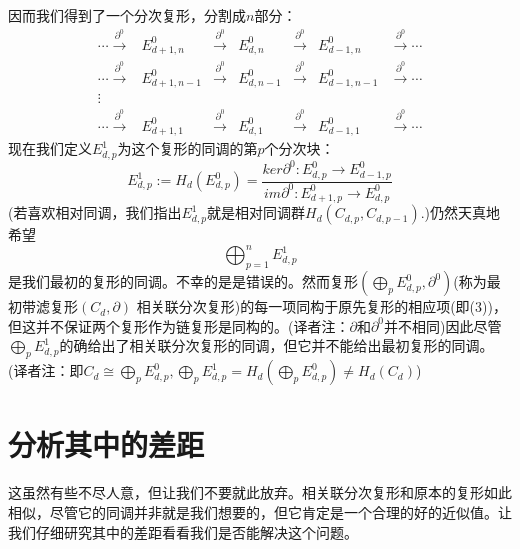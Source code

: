 \documentclass[a4paper,11pt,openany]{ctexart}
\begin{document}
因而我们得到了一个分次复形，分割成$n$部分：
\begin{equation}
  \begin{array}{ccccccc}
     \cdots\xrightarrow{\partial^0}& E_{d+1,n}^0& \xrightarrow{\partial^0}&E_{d,n}^0&\xrightarrow{\partial^0}&E_{d-1,n}^0& \xrightarrow{\partial^0} \cdots \\
     \cdots\xrightarrow{\partial^0}& E_{d+1,n-1}^0 & \xrightarrow{\partial^0}&E_{d,n-1}^0&\xrightarrow{\partial^0}&E_{d-1,n-1}^0& \xrightarrow{\partial^0} \cdots \\
     \vdots \\
     \cdots\xrightarrow{\partial^0}& E_{d+1,1}^0& \xrightarrow{\partial^0}&E_{d,1}^0&\xrightarrow{\partial^0}&E_{d-1,1}^0& \xrightarrow{\partial^0} \cdots
   \end{array}
\end{equation}
现在我们定义$E^1_{d,p}$为这个复形的同调的第$p$个分次块：
\begin{equation}
  E^1_{d,p}:=H_d(E^0_{d,p})=\frac{ker \partial^0:E^0_{d,p}\to E_{d-1,p}^0}{im \partial^0:E^0_{d+1,p}\to E_{d,p}^0}
\end{equation}
(若喜欢相对同调，我们指出$E_{d,p}^1$就是相对同调群$H_d(C_{d,p},C_{d,p-1}).$)仍然天真地希望
\begin{equation}
  \bigoplus_{p=1}^nE^1_{d,p}
\end{equation}
是我们最初的复形的同调。不幸的是是错误的。然而复形$(\bigoplus_p E_{d,p}^0,\partial^0)$(称为最初带滤复形$(C_d,\partial)$ 相关联分次复形)的每一项同构于原先复形的相应项(即(3))，但这并不保证两个复形作为链复形是同构的。(译者注：$\partial$和$\partial^0$并不相同)因此尽管$\bigoplus_p E_{d,p}^1$的确给出了相关联分次复形的同调，但它并不能给出最初复形的同调。(译者注：即$C_d\cong \bigoplus_{p} E_{d,p}^0,\bigoplus_p E_{d,p}^1=H_d(\bigoplus_p E_{d,p}^0)\neq H_d(C_d)$)

\section{分析其中的差距}
这虽然有些不尽人意，但让我们不要就此放弃。相关联分次复形和原本的复形如此相似，尽管它的同调并非就是我们想要的，但它肯定是一个合理的好的近似值。让我们仔细研究其中的差距看看我们是否能解决这个问题。
\end{document}
